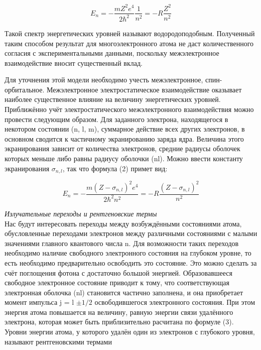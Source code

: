 \documentclass[a4paper, 12pt]{article}%
\begin{document}
	\begin{equation}
		E_n=-\frac{m Z^2 e^4}{2 \hbar^2} \frac{1}{n^2}=-R \frac{Z^2}{n^2}
	\end{equation}
	
	Такой спектр энергетических уровней называют водородоподобным. Полученный таким
	способом результат для многоэлектронного атома не даст количественного согласия с экспериментальными данными, поскольку межэлектронное
	взаимодействие вносит существенный вклад.
	
	Для уточнения этой модели необходимо учесть межэлектронное, спин-орбитальное. Межэлектронное электростатическое взаимодействие оказывает наиболее существенное влияние
	на величину энергетических уровней.
	Приближённо учёт электростатического межэлектронного взаимодействия можно провести следующим образом. Для заданного электрона,
	находящегося в некотором состоянии (n, l, m), суммарное действие всех
	других электронов, в основном сводится к частичному экранированию
	заряда ядра. Величина этого экранирования зависит от количества электронов, средние радиусы оболочек которых меньше либо равны радиусу оболочки (nl). Можно ввести константу экранирования $\sigma_{n, l}$, так что
	формула (2) примет вид:
	
	\begin{equation}
		E_n=-\frac{m (Z - \sigma_{n, l})^2 e^4}{2 \hbar^2 n^2}=-R \frac{(Z - \sigma_{n, l})^2}{n^2}
	\end{equation}

	\addvspace{20pt}

	\textit{Излучательные переходы и рентгеновские термы}\\
	
	Нас будут интересовать переходы между возбуждёнными состояниями атома, обусловленные переходами электронов между различными состояниями с малыми значениями главного квантового
	числа n. Для возможности таких переходов необходимо наличие свободного электронного состояния на глубоком уровне, то есть необходимо
	предварительно освободить это состояние. Это
	можно сделать за счёт поглощения фотона с достаточно большой энергией. Образовавшееся свободное электронное состояние приводит к тому,
	что соответствующая электронная оболочка (nl) становится частично заполнена, и она приобретает момент импульса j = l $\pm 1/2$
	освободившегося
	электронного состояния. При этом энергия атома повышается на величину, равную энергии связи удалённого электрона, которая может быть
	приблизительно расчитана по формуле (3). Уровни энергии атома, у
	которого удалён один из электронов с глубокого уровня, называют рентгеновскими термами
	
\end{document}

